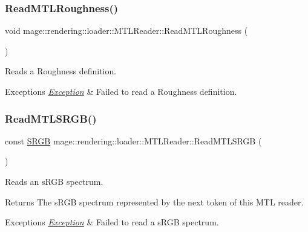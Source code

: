 \subsubsection{\texorpdfstring{Read\+M\+T\+L\+Roughness()}{ReadMTLRoughness()}}
{\footnotesize\ttfamily void mage\+::rendering\+::loader\+::\+M\+T\+L\+Reader\+::\+Read\+M\+T\+L\+Roughness (\begin{DoxyParamCaption}{ }\end{DoxyParamCaption})\hspace{0.3cm}{\ttfamily [private]}}

Reads a Roughness definition.


\begin{DoxyExceptions}{Exceptions}
{\em \mbox{\hyperlink{classmage_1_1_exception}{Exception}}} & Failed to read a Roughness definition. \\
\hline
\end{DoxyExceptions}
\mbox{\label{classmage_1_1rendering_1_1loader_1_1_m_t_l_reader_aaefa7c67f90d7d592366acdb898993b3}} 
\subsubsection{\texorpdfstring{Read\+M\+T\+L\+S\+R\+G\+B()}{ReadMTLSRGB()}}
{\footnotesize\ttfamily const \mbox{\hyperlink{structmage_1_1_s_r_g_b}{S\+R\+GB}} mage\+::rendering\+::loader\+::\+M\+T\+L\+Reader\+::\+Read\+M\+T\+L\+S\+R\+GB (\begin{DoxyParamCaption}{ }\end{DoxyParamCaption})\hspace{0.3cm}{\ttfamily [private]}}

Reads an s\+R\+GB spectrum.

\begin{DoxyReturn}{Returns}
The s\+R\+GB spectrum represented by the next token of this M\+TL reader. 
\end{DoxyReturn}

\begin{DoxyExceptions}{Exceptions}
{\em \mbox{\hyperlink{classmage_1_1_exception}{Exception}}} & Failed to read a s\+R\+GB spectrum. \\
\hline
\end{DoxyExceptions}
\mbox{\label{classmage_1_1rendering_1_1loader_1_1_m_t_l_reader_a5b03c5c7aee393e60ea6c3bd7ff15614}} 
